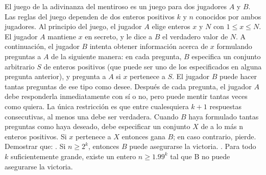 El juego de la adivinanza del mentiroso es un juego para dos jugadores $A$ y $B$. Las reglas del juego dependen de dos enteros positivos $k$ y $n$ conocidos por ambos jugadores. \newline 
Al principio del juego, el jugador $A$ elige enteros $x$ y $N$ con $1 \leq x \leq N$. El jugador $A$ mantiene $x$ en secreto, y le dice a $B$ el verdadero valor de $N$. A continuación, el jugador $B$ intenta obtener información acerca de $x$ formulando preguntas a $A$ de la siguiente manera: en cada pregunta, $B$ especifica un conjunto arbitrario $S$ de enteros positivos (que puede ser uno de los especificados en alguna pregunta anterior), y pregunta a $A$ si $x$ pertenece a $S$. El jugador $B$ puede hacer tantas preguntas de ese tipo como desee. Después de cada pregunta, el jugador $A$ debe responderla inmediatamente con sí o no, pero puede mentir tantas veces como quiera. La única restricción es que entre cualesquiera $k + 1$ respuestas consecutivas, al menos una debe ser verdadera. \newline 
Cuando $B$ haya formulado tantas preguntas como haya deseado, debe especificar un conjunto $X$ de a lo más n enteros positivos. Si $x$ pertenece a $X$ entonces gana $B$; en caso contrario, pierde. Demostrar que: . Si $n \geq 2^k$, entonces $B$ puede asegurarse la victoria. . Para todo $k$ suficientemente grande, existe un entero $n \geq 1.99^k$ tal que B no puede asegurarse la victoria.